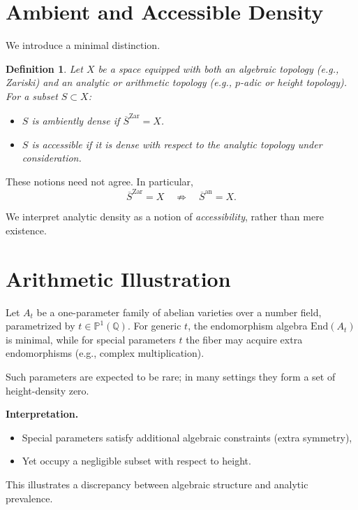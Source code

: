 \documentclass[11pt]{article}
\newtheorem{definition}{Definition}
\begin{document}
\section{Ambient and Accessible Density}

We introduce a minimal distinction.

\begin{definition}
Let $X$ be a space equipped with both an algebraic topology (e.g., Zariski) and an analytic or arithmetic topology (e.g., $p$-adic or height topology). For a subset $S \subset X$:
\begin{itemize}
    \item $S$ is \emph{ambiently dense} if $\overline{S}^{\mathrm{Zar}} = X$.
    \item $S$ is \emph{accessible} if it is dense with respect to the analytic topology under consideration.
\end{itemize}
\end{definition}

These notions need not agree. In particular,
\[
\overline{S}^{\mathrm{Zar}} = X \quad \not\Rightarrow \quad \overline{S}^{\mathrm{an}} = X.
\]

We interpret analytic density as a notion of \emph{accessibility}, rather than mere existence.

\section{Arithmetic Illustration}

Let $A_t$ be a one-parameter family of abelian varieties over a number field, parametrized by $t \in \mathbb{P}^1(\mathbb{Q})$. For generic $t$, the endomorphism algebra $\mathrm{End}(A_t)$ is minimal, while for special parameters $t$ the fiber may acquire extra endomorphisms (e.g., complex multiplication).

Such parameters are expected to be rare; in many settings they form a set of height-density zero.

\medskip

\noindent
\textbf{Interpretation.}
\begin{itemize}
    \item Special parameters satisfy additional algebraic constraints (extra symmetry),
    \item Yet occupy a negligible subset with respect to height.
\end{itemize}

This illustrates a discrepancy between algebraic structure and analytic prevalence.
\end{document}
